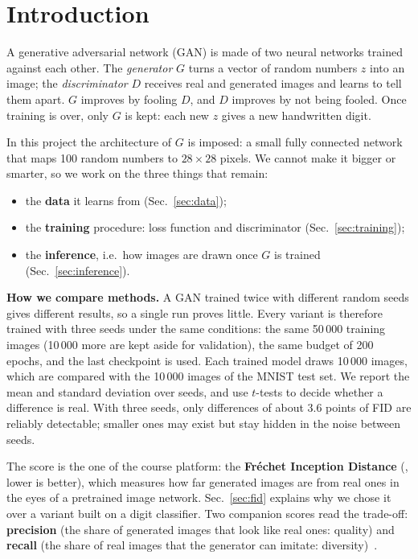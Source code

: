 \section{Introduction}\label{sec:intro}

A generative adversarial network (GAN) is made of two neural networks trained against each other. The
\emph{generator} $G$ turns a vector of random numbers $z$ into an image; the \emph{discriminator} $D$ receives real and
generated images and learns to tell them apart. $G$ improves by fooling $D$, and $D$ improves by not being fooled. Once
training is over, only $G$ is kept: each new $z$ gives a new handwritten digit.

In this project the architecture of $G$ is imposed: a small fully connected network that maps 100 random numbers to
$28\times28$ pixels. We cannot make it bigger or smarter, so we work on the three things that remain:
\begin{itemize}
\item the \textbf{data} it learns from (Sec.~\ref{sec:data});
\item the \textbf{training} procedure: loss function and discriminator (Sec.~\ref{sec:training});
\item the \textbf{inference}, i.e.\ how images are drawn once $G$ is trained (Sec.~\ref{sec:inference}).
\end{itemize}

\textbf{How we compare methods.} A GAN trained twice with different random seeds gives different results, so a single
run proves little. Every variant is therefore trained with three seeds under the same conditions: the same 50\,000
training images (10\,000 more are kept aside for validation), the same budget of 200 epochs, and the last checkpoint is
used. Each trained model draws 10\,000 images, which are compared with the 10\,000 images of the MNIST test set. We report
the mean and standard deviation over seeds, and use $t$-tests to decide whether a difference is real. With three seeds,
only differences of about 3.6 points of FID are reliably detectable; smaller ones may exist but stay hidden in the noise
between seeds.

The score is the one of the course platform: the \textbf{Fréchet Inception Distance} (\finc{}, lower is better), which
measures how far generated images are from real ones in the eyes of a pretrained image network. Sec.~\ref{sec:fid} explains
why we chose it over a variant built on a digit classifier. Two companion scores read the trade-off: \textbf{precision}
(the share of generated images that look like real ones: quality) and \textbf{recall} (the share of real images that the
generator can imitate: diversity)~\cite{kynkaanniemi2019}.

